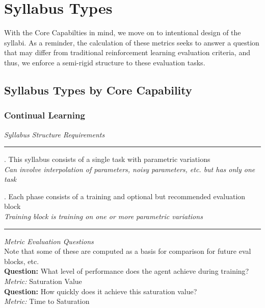\chapter{Syllabus Types}\label{ch:syllabus_and_metric_types}

With the Core Capabilties in mind, we move on to intentional design of the syllabi. As a reminder, the calculation of these metrics seeks to answer a question that may differ from traditional reinforcement learning evaluation criteria, and thus, we enforce a semi-rigid structure to these evaluation tasks.
    
    
\section{Syllabus Types by Core Capability} 


\subsection*{Continual Learning} 
\textit{Syllabus Structure Requirements}\\
\noindent\rule{8cm}{0.4pt}
. This syllabus consists of a single task with parametric variations\\
\textit{Can involve interpolation of parameters, noisy parameters, etc. but has only one task \\}


. Each phase consists of a training and optional but recommended evaluation block\\
\textit{Training block is training on one or more parametric variations \\}
\noindent\rule{8cm}{0.4pt}

\flushleft\textit{Metric Evaluation Questions}\\[0.1in]

Note that some of these are computed as a basis for comparison for future eval blocks, etc.\\[0.1in]

\textbf{Question:} What level of performance does the agent achieve during training?\\
\textit{Metric:} Saturation Value\\[0.1in]


\textbf{Question:} How quickly does it achieve this saturation value?\\
\textit{Metric:} Time to Saturation\\[0.1in]

